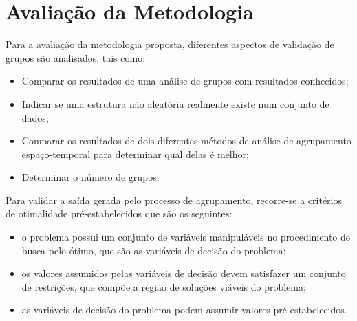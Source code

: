 \begin{figure}[!ht]
	\centering	
\end{figure}
\FloatBarrier

\section{Avaliação da Metodologia}

Para a avaliação da metodologia proposta, diferentes aspectos de validação de grupos são analisados, tais como:
\begin{itemize}
    \item Comparar os resultados de uma análise de grupos com resultados conhecidos;
    \item Indicar se uma estrutura não aleatória realmente existe num conjunto de dados;
    \item Comparar os resultados de dois diferentes métodos de análise de agrupamento espaço-temporal para determinar qual delas é melhor;
    \item Determinar o número de grupos.
\end{itemize}

Para validar a saída gerada pelo processo de agrupamento, recorre-se a critérios de otimalidade pré-estabelecidos que são os seguintes:
\begin{itemize}
    \item o problema possui um conjunto de variáveis manipuláveis no procedimento de busca pelo ótimo, que são as variáveis de decisão do problema;
    \item os valores assumidos pelas variáveis de decisão devem satisfazer um conjunto de restrições, que compõe a região de soluções viáveis do problema;
    \item as variáveis de decisão do problema podem assumir valores pré-estabelecidos.
\end{itemize}

